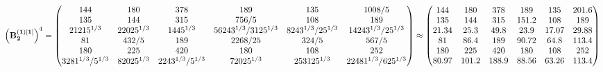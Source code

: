\documentclass[10pt,a4paper]{article}
\begin{document}
	\[
		\left(\bold{B_2^{(1)[1]}}\right)^{4} = 
		\begin{pmatrix}
			{{144}}{} & {{180}}{} & {{378}}{} & {{189}}{} & {{135}}{} & {{1008}} / {{5}} \\
			{{135}}{} & {{144}}{} & {{315}}{} & {{756}} / {{5}} & {{108}}{} & {{189}}{} \\
			{{2}{1215^ {1 / 3}}}{} & {{2}{2025^ {1 / 3}}}{} & {{14}{45^ {1 / 3}}}{} & {{56}{243^ {1 / 3}}} / {{3125^ {1 / 3}}} & {{8}{243^ {1 / 3}}} / {{25^ {1 / 3}}} & {{14}{243^ {1 / 3}}} / {{25^ {1 / 3}}} \\
			{{81}}{} & {{432}} / {{5}} & {{189}}{} & {{2268}} / {{25}} & {{324}} / {{5}} & {{567}} / {{5}} \\
			{{180}}{} & {{225}}{} & {{420}}{} & {{180}}{} & {{108}}{} & {{252}}{} \\
			{{32}{81^ {1 / 3}}} / {{5^ {1 / 3}}} & {{8}{2025^ {1 / 3}}}{} & {{224}{3^ {1 / 3}}} / {{5^ {1 / 3}}} & {{7}{2025^ {1 / 3}}}{} & {{253125^ {1 / 3}}}{} & {{224}{81^ {1 / 3}}} / {{625^ {1 / 3}}} \\
		\end{pmatrix}
		\approx
		\begin{pmatrix}
			144      & 180      & 378      & 189      & 135      & 201.6    \\
			135      & 144      & 315      & 151.2    & 108      & 189      \\
			21.34    & 25.3     & 49.8     & 23.9     & 17.07    & 29.88    \\
			81       & 86.4     & 189      & 90.72    & 64.8     & 113.4    \\
			180      & 225      & 420      & 180      & 108      & 252      \\
			80.97    & 101.2    & 188.9    & 88.56    & 63.26    & 113.4    \\
		\end{pmatrix}
	\]
\end{document}
